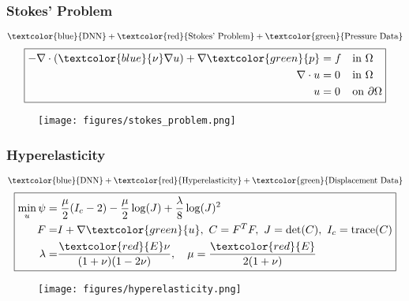\documentclass[usenames,dvipsnames]{beamer}
\begin{document}
\begin{frame}
	\frametitle{Stokes' Problem}

		$$\text{\textcolor{blue}{DNN}} + \text{\textcolor{red}{Stokes' Problem}} + \text{\textcolor{green}{Pressure Data}}$$ 
	\begin{equation*}
	\boxed{\begin{aligned}
		- \nabla \cdot (\textcolor{blue}{\nu} \nabla u) + \nabla \textcolor{green}{p} &= f && \text{in } \Omega \\ 
		\nabla \cdot u &= 0 && \text{in } \Omega \\ 
		u &= 0 &&\text{on }\partial \Omega
	\end{aligned}}
\end{equation*}
	\begin{figure}[hbt]
		\texttt{[image: figures/stokes\_problem.png]}
	\end{figure}
	
\end{frame}


\begin{frame}
	\frametitle{Hyperelasticity}
	
	$$\text{\textcolor{blue}{DNN}} + \text{\textcolor{red}{Hyperelasticity}} + \text{\textcolor{green}{Displacement Data}}$$ 
	\begin{equation*}
		\boxed{\begin{aligned}
				\min_u \psi =&\; \frac{\mu}{2}(I_c - 2) - \frac{\mu}{2}\log(J) + \frac{\lambda}{8}\log(J)^2\\
				F =& I + \nabla \textcolor{green}{u}, \ C = F^TF, \ J = \text{det}(C), \ I_c = \text{trace}(C)\\
				\lambda =& \frac{\textcolor{red}{E}\nu}{(1+\nu)(1-2\nu)}, \quad \mu = \frac{\textcolor{red}{E}}{2(1+\nu)}
		\end{aligned}}
	\end{equation*}
	\begin{figure}[hbt]
		\texttt{[image: figures/hyperelasticity.png]}
	\end{figure}
	
\end{frame}
\end{document}
